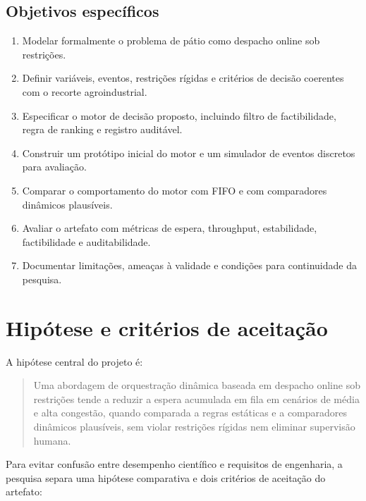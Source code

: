 \documentclass[
  12pt,
  oneside,
  a4paper,
  sumario=tradicional,
  brazil
]{abntex2}
\begin{document}
\section{Objetivos espec\'ificos}
\begin{enumerate}[leftmargin=1.27cm,itemsep=0pt,topsep=0pt,parsep=0pt,partopsep=0pt]
  \item Modelar formalmente o problema de p\'atio como despacho online sob restri\c{c}\~oes.
  \item Definir vari\'aveis, eventos, restri\c{c}\~oes r\'igidas e crit\'erios de decis\~ao coerentes com o recorte agroindustrial.
  \item Especificar o motor de decis\~ao proposto, incluindo filtro de factibilidade, regra de ranking e registro audit\'avel.
  \item Construir um prot\'otipo inicial do motor e um simulador de eventos discretos para avalia\c{c}\~ao.
  \item Comparar o comportamento do motor com FIFO e com comparadores din\^amicos plaus\'iveis.
  \item Avaliar o artefato com m\'etricas de espera, throughput, estabilidade, factibilidade e auditabilidade.
  \item Documentar limita\c{c}\~oes, amea\c{c}as \`a validade e condi\c{c}\~oes para continuidade da pesquisa.
\end{enumerate}

\chapter{Hip\'otese e crit\'erios de aceita\c{c}\~ao}

A hip\'otese central do projeto \'e:

\begin{quote}
Uma abordagem de orquestra\c{c}\~ao din\^amica baseada em despacho online sob restri\c{c}\~oes tende a reduzir a espera acumulada em fila em cen\'arios de m\'edia e alta congest\~ao, quando comparada a regras est\'aticas e a comparadores din\^amicos plaus\'iveis, sem violar restri\c{c}\~oes r\'igidas nem eliminar supervis\~ao humana.
\end{quote}

Para evitar confus\~ao entre desempenho cient\'ifico e requisitos de engenharia, a pesquisa separa uma hip\'otese comparativa e dois crit\'erios de aceita\c{c}\~ao do artefato:
\end{document}
